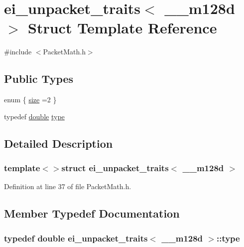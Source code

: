 \hypertarget{structei__unpacket__traits_3_01____m128d_01_4}{\section{ei\-\_\-unpacket\-\_\-traits$<$ \-\_\-\-\_\-m128d $>$ Struct Template Reference}
\label{structei__unpacket__traits_3_01____m128d_01_4}
}


{\ttfamily \#include $<$Packet\-Math.\-h$>$}

\subsection*{Public Types}
\begin{DoxyCompactItemize}
\item 
enum \{ \hyperlink{structei__unpacket__traits_3_01____m128d_01_4_a81dee403e9a7f7872227d3a41ccde7c7a9527e9b5e5d9ce47bc0594cf0aab8503}{size} =2
 \}
\item 
typedef \hyperlink{_super_l_u_support_8h_a8956b2b9f49bf918deed98379d159ca7}{double} \hyperlink{structei__unpacket__traits_3_01____m128d_01_4_ab487ac6baa7f30a4a64cd398a8c236ca}{type}
\end{DoxyCompactItemize}


\subsection{Detailed Description}
\subsubsection*{template$<$$>$struct ei\-\_\-unpacket\-\_\-traits$<$ \-\_\-\-\_\-m128d $>$}



Definition at line 37 of file Packet\-Math.\-h.



\subsection{Member Typedef Documentation}
\hypertarget{structei__unpacket__traits_3_01____m128d_01_4_ab487ac6baa7f30a4a64cd398a8c236ca}{
\subsubsection[{type}]{\setlength{\rightskip}{0pt plus 5cm}typedef {\bf double} {\bf ei\-\_\-unpacket\-\_\-traits}$<$ \-\_\-\-\_\-m128d $>$\-::{\bf type}}}\label{structei__unpacket__traits_3_01____m128d_01_4_ab487ac6baa7f30a4a64cd398a8c236ca}


